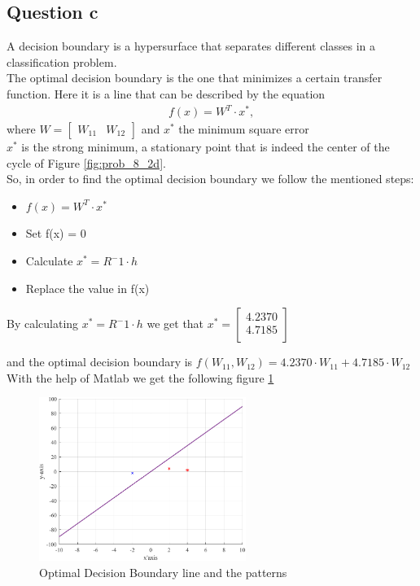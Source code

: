 \vspace{2cm}
\subsection{Question c}
\label{Questionc}
A decision boundary is a hypersurface that separates different classes in a classification problem.\\
The optimal decision boundary is the one that minimizes a certain transfer function. Here it is a line that can be described by the equation 
\[
\begin{gathered}
	f(x) = W^T \cdot x^*, 
\end{gathered}
\]
where $
W=\left[\begin{array}{cc}
	W_{11} & W_{12}
\end{array}
\right]
$ and $x^*$ the minimum square error \\
$x^*$ is the strong minimum, a stationary point that is indeed the center of the cycle of Figure \ref{fig:prob_8_2d}.\\

So, in order to find the optimal decision boundary we follow the mentioned steps:
\begin{itemize}
	\item $f(x) = W^T \cdot x^*$
	\item Set f(x) = 0
	\item Calculate $x^* = R^-1 \cdot h$
	\item Replace the value in f(x)
\end{itemize}

By calculating $x^* = R^-1 \cdot h$ we get that $x^* = \left[\begin{array}{c}
															4.2370 \\
															4.7185 \\
														\end{array}
														\right] $

\vspace{5mm}
and the optimal decision boundary is $f(W_{11},W_{12}) = 4.2370 \cdot W_{11} + 4.7185 \cdot W_{12} $ \\

With the help of Matlab we get the following figure \ref{fig:patterns}

\begin{figure}[H]
	\centering
	\includegraphics[width = 0.6\textwidth]{../Problem 8/patterns.pdf}
	\caption{Optimal Decision Boundary line and the patterns}
	\label{fig:patterns}
\end{figure}

